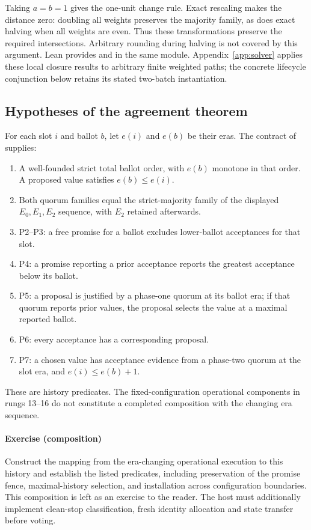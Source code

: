 \documentclass[10pt,journal,letterpaper]{IEEEtran}
\begin{document}
Taking $a=b=1$ gives the one-unit change rule. Exact rescaling makes the distance zero: doubling all weights preserves the majority family, as does exact halving when all weights are even. Thus these transformations preserve the required intersections. Arbitrary rounding during halving is not covered by this argument. Lean provides  and  in the same module. Appendix~\ref{app:solver} applies these local closure results to arbitrary finite weighted paths; the concrete lifecycle conjunction below retains its stated two-batch instantiation.

\subsection{Hypotheses of the agreement theorem}
For each slot $i$ and ballot $b$, let $e(i)$ and $e(b)$ be their eras. The contract of  supplies:
\begin{enumerate}
\item A well-founded strict total ballot order, with $e(b)$ monotone in that order. A proposed value satisfies $e(b)\leq e(i)$.
\item Both quorum families equal the strict-majority family of the displayed $E_0,E_1,E_2$ sequence, with $E_2$ retained afterwards.
\item P2--P3: a free promise for a ballot excludes lower-ballot acceptances for that slot.
\item P4: a promise reporting a prior acceptance reports the greatest acceptance below its ballot.
\item P5: a proposal is justified by a phase-one quorum at its ballot era; if that quorum reports prior values, the proposal selects the value at a maximal reported ballot.
\item P6: every acceptance has a corresponding proposal.
\item P7: a chosen value has acceptance evidence from a phase-two quorum at the slot era, and $e(i)\leq e(b)+1$.
\end{enumerate}
These are history predicates. The fixed-configuration operational components in rungs 13--16 do not constitute a completed composition with the changing era sequence.

\paragraph{Exercise (composition)}
Construct the mapping from the era-changing operational execution to this history and establish the listed predicates, including preservation of the promise fence, maximal-history selection, and installation across configuration boundaries. This composition is left as an exercise to the reader. The host must additionally implement clean-stop classification, fresh identity allocation and state transfer before voting.
\end{document}
